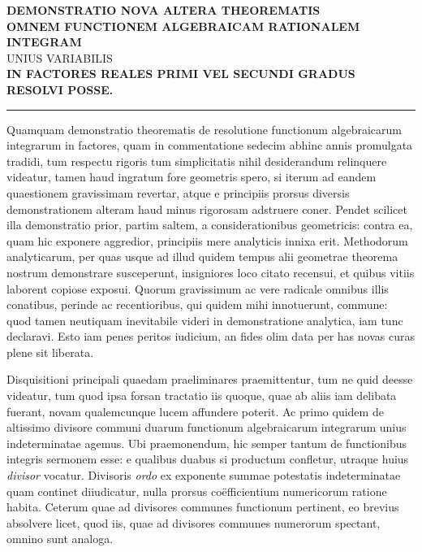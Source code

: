 \begin{center}
\textbf{DEMONSTRATIO NOVA ALTERA THEOREMATIS}\\[12pt]
\textbf{OMNEM FUNCTIONEM ALGEBRAICAM RATIONALEM INTEGRAM}\\[12pt]
UNIUS VARIABILIS\\[12pt]
\textbf{IN FACTORES REALES PRIMI VEL SECUNDI GRADUS RESOLVI POSSE.}\\[12pt]
\rule{3cm}{0.3pt}
\end{center}

 Quamquam demonstratio theorematis de resolutione functionum algebraicarum integrarum in factores, quam in commentatione sedecim abhinc annis promulgata tradidi, tum respectu rigoris tum simplicitatis nihil desiderandum relinquere videatur, tamen haud ingratum fore geometris spero, si iterum ad eandem quaestionem gravissimam revertar, atque e principiis prorsus diversis demonstrationem alteram haud minus rigorosam adstruere coner. Pendet scilicet illa demonstratio prior, partim saltem, a considerationibus geometricis: contra ea, quam hic exponere aggredior, principiis mere analyticis innixa erit. Methodorum analyticarum, per quas usque ad illud quidem tempus alii geometrae theorema nostrum demonstrare susceperunt, insigniores loco citato recensui, et quibus vitiis laborent copiose exposui. Quorum gravissimum ac vere radicale omnibus illis conatibus, perinde ac recentioribus, qui quidem mihi innotuerunt, commune: quod tamen neutiquam inevitabile videri in demonstratione analytica, iam tunc declaravi. Esto iam penes peritos iudicium, an fides olim data per has novas curas plene sit liberata.

 Disquisitioni principali quaedam praeliminares praemittentur, tum ne quid deesse videatur, tum quod ipsa forsan tractatio iis quoque, quae ab aliis iam 
delibata fuerant, novam qualemcunque lucem affundere poterit. Ac primo quidem de altissimo divisore communi duarum functionum algebraicarum integrarum unius indeterminatae agemus. Ubi praemonendum, hic semper tantum de functionibus integris sermonem esse: e qualibus duabus si productum confletur, utraque huius \textit{divisor} vocatur. Divisoris \textit{ordo} ex exponente summae potestatis indeterminatae quam continet diiudicatur, nulla prorsus coëfficientium numericorum ratione habita. Ceterum quae ad divisores communes functionum pertinent, eo brevius absolvere licet, quod iis, quae ad divisores communes numerorum spectant, omnino sunt analoga.

